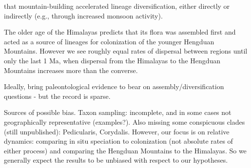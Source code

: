 that mountain-building accelerated lineage diversification, either directly or indirectly (e.g., through increased monsoon activity).



The older age of the Himalayas predicts that its flora was assembled first and acted as a source of lineages for colonization of the younger Hengduan Mountains. However we see roughly equal rates of dispersal between regions until only the last 1 Ma, when dispersal from the Himalayas to the Hengduan Mountains increases more than the converse. 



Ideally, bring paleontological evidence to bear on assembly/diversification questions - but the record is sparse.

Sources of possible bias. Taxon sampling: incomplete, and in some cases not geographically representative (examples?). Also missing some conspicuous clades (still unpublished): Pedicularis, Corydalis. However, our focus is on relative dynamics: comparing in situ speciation to colonization (not absolute rates of either process) and comparing the Hengduan Mountains to the Himalayas. So we generally expect the results to be unbiased with respect to our hypotheses.
